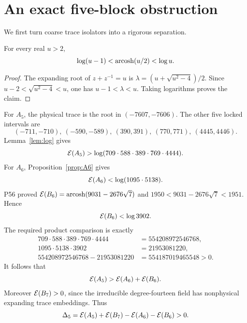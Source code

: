 \section{An exact five-block obstruction}

We first turn coarse trace isolators into a rigorous separation.

\begin{lemma}\label{lem:log}
For every real \(u>2\),
\[
 \log(u-1)<\operatorname{arcosh}(u/2)<\log u.
\]
\end{lemma}

\begin{proof}
The expanding root of \(z+z^{-1}=u\) is
\(\lambda=(u+\sqrt{u^2-4})/2\).  Since
\(u-2<\sqrt{u^2-4}<u\), one has \(u-1<\lambda<u\).
Taking logarithms proves the claim.
\end{proof}

For \(A_5\), the physical trace is the root in \((-7607,-7606)\).
The other five locked intervals are
\[
 (-711,-710),\ (-590,-589),\ (390,391),\ (770,771),\ (4445,4446).
\]
Lemma~\ref{lem:log} gives
\begin{equation}\label{eq:A5lower}
 \mathcal E(A_5)>
 \log(709\cdot588\cdot389\cdot769\cdot4444).
\end{equation}
For \(A_6\), Proposition~\ref{prop:A6} gives
\begin{equation}\label{eq:A6upper}
 \mathcal E(A_6)<\log(1095\cdot5138).
\end{equation}
P56 proved
\(\mathcal E(B_6)=\operatorname{arcosh}(9031-2676\sqrt7)\) and
\(1950<9031-2676\sqrt7<1951\).  Hence
\begin{equation}\label{eq:B6upper}
 \mathcal E(B_6)<\log3902.
\end{equation}
The required product comparison is exactly
\begin{align}
 709\cdot588\cdot389\cdot769\cdot4444
 &=554208972546768,\label{eq:lower-product}\\
 1095\cdot5138\cdot3902
 &=21953081220,\label{eq:upper-product}\\
 554208972546768-21953081220
 &=554187019465548>0.\label{eq:margin}
\end{align}
It follows that
\begin{equation}\label{eq:stronger}
 \mathcal E(A_5)>\mathcal E(A_6)+\mathcal E(B_6).
\end{equation}
Moreover \(\mathcal E(B_7)>0\), since the irreducible degree-fourteen field has
nonphysical expanding trace embeddings.  Thus
\begin{equation}\label{eq:delta-positive}
 \Delta_5=\mathcal E(A_5)+\mathcal E(B_7)-\mathcal E(A_6)-\mathcal E(B_6)>0.
\end{equation}

